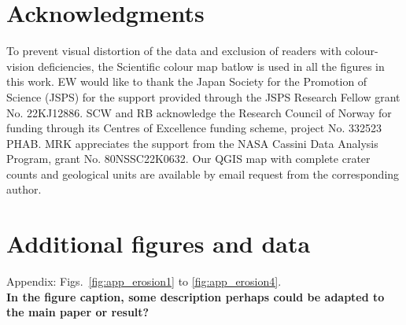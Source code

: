 \documentclass[preprint,11pt,3p,times,authoryear]{elsarticle}
\begin{document}
{\section*{Acknowledgments}
To prevent visual distortion of the data and exclusion of readers with colour-vision deficiencies, the Scientific colour map batlow \citet{Crameri2020} is used in all the figures in this work. EW would like to thank the Japan Society for the Promotion of Science (JSPS) for the support provided through the JSPS Research Fellow grant No. 22KJ12886. SCW and RB acknowledge the Research Council of Norway for funding through its Centres of Excellence funding scheme, project No. 332523 PHAB. MRK appreciates the support from the NASA Cassini Data Analysis Program, grant No. 80NSSC22K0632. Our QGIS map with complete crater counts and geological units are available by email request from the corresponding author.\\



{}
\pagebreak

\appendix
\section{Additional figures and data}
\setcounter{figure}{0}
Appendix: Figs.~\ref{fig:app_erosion1} to \ref{fig:app_erosion4}.\\
\textbf{In the figure caption, some description perhaps could be adapted to the main paper or result? }


}
\end{document}
